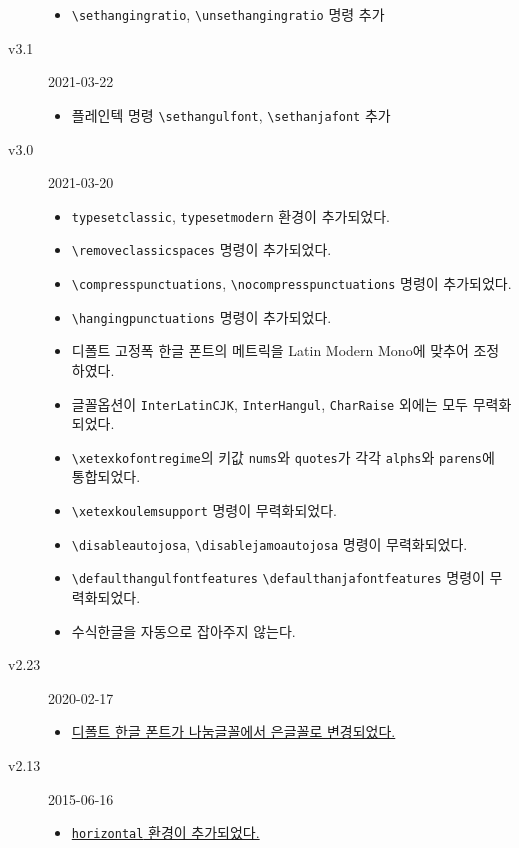 \documentclass[a4paper]{article}
\def\cs#1{\texttt{\textbackslash #1}}
\begin{document}
\begin{small}
\begin{description}
\begin{itemize}
        \item \cs{sethangingratio}, \cs{unsethangingratio} 명령 추가
      \end{itemize}
    \item[v3.1] 2021-03-22
      \begin{itemize}
        \item 플레인텍 명령 \cs{sethangulfont}, \cs{sethanjafont} 추가
      \end{itemize}
    \item[v3.0] 2021-03-20
      \begin{itemize}
        \item \verb|typesetclassic|, \verb|typesetmodern| 환경이 추가되었다.
        \item \cs{removeclassicspaces} 명령이 추가되었다.
        \item \cs{compresspunctuations}, \cs{nocompresspunctuations} 명령이 추가되었다.
        \item \cs{hangingpunctuations} 명령이 추가되었다.
        \item 디폴트 고정폭 한글 폰트의 메트릭을 Latin Modern Mono에
          맞추어 조정하였다.
        \item 글꼴옵션이 \verb|InterLatinCJK|, \verb|InterHangul|, \verb|CharRaise|
          외에는 모두 무력화되었다.
        \item \cs{xetexkofontregime}의 키값 \verb|nums|와 \verb|quotes|가
          각각 \verb|alphs|와 \verb|parens|에 통합되었다.
        \item \cs{xetexkoulemsupport} 명령이 무력화되었다.
        \item \cs{disableautojosa}, \cs{disablejamoautojosa} 명령이 무력화되었다.
        \item \cs{defaulthangulfontfeatures} \cs{defaulthanjafontfeatures}
          명령이 무력화되었다.
        \item 수식한글을 자동으로 잡아주지 않는다.
      \end{itemize}
    \item[v2.23] 2020-02-17
      \begin{itemize}
        \item \hyperref[sec:fontcmds]
          {디폴트 한글 폰트가 나눔글꼴에서 은글꼴로 변경되었다.}
      \end{itemize}
    \item[v2.13] 2015-06-16
      \begin{itemize}
        \item \hyperref[sec:verttype]
          {\texttt{horizontal} 환경이 추가되었다.}

\end{itemize}
\end{description}
\end{small}
\end{document}
